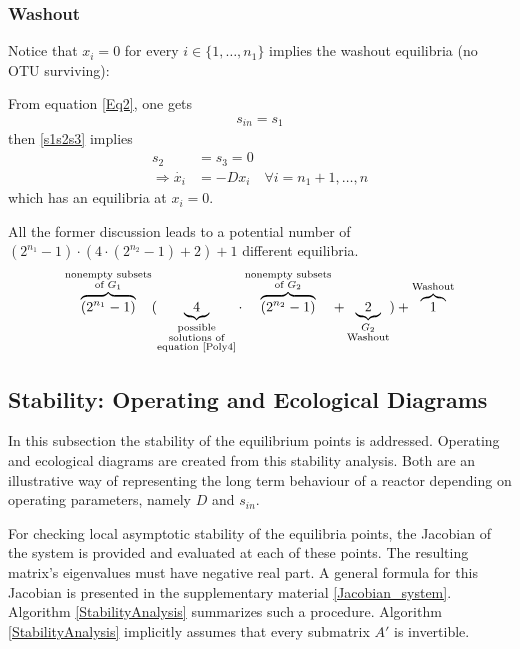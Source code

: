 \documentclass[3p,times]{elsarticle}
\begin{document}
\subsubsection{Washout}	
Notice that $x_i = 0$ for every $i \in \{1,\dots, n_1\}$ implies the washout equilibria (no OTU surviving):

From equation \eqref{Eq2}, one gets 
\begin{align*} s_{in} = s_1 \end{align*}
then \eqref{s1s2s3} implies \begin{align*}s_2 &= s_3 = 0 \\ \Rightarrow \dot{x_i} &= -Dx_i \quad \forall i = n_1+1, \dots, n\end{align*}   
which has an equilibria at $x_i = 0$. 

All the former discussion leads to a potential number of   $ (2^{n_1}-1)\cdot (4\cdot(2^{n_2}-1)+2)+1 $  different equilibria. 
\begin{align} \overbrace{(2^{n_1}-1)}^{\substack{\text{nonempty subsets} \\ \text{of }G_1 }} (\underbrace{4}_{\substack{\text{possible} \\ \text{solutions of} \\ \text{equation \eqref{Poly4}}}} \cdot\overbrace{(2^{n_2}-1)}^{\substack{\text{nonempty subsets} \\ \text{of  }G_2}}+\underbrace{2}_{\substack{G_2 \\ \text{Washout}}})+\overbrace{1}^\text{Washout} 
\end{align}

\subsection{Stability: Operating and Ecological Diagrams}

In this subsection the stability of the equilibrium points is addressed. Operating and ecological diagrams are created from this stability analysis. Both are an illustrative way of representing the long term behaviour of a reactor depending on operating parameters, namely $D$ and $s_{in}$. 

For checking local asymptotic stability of the equilibria points, the Jacobian of the system is provided and evaluated at each of these points. The resulting matrix's eigenvalues must have negative real part. A general formula for this Jacobian is presented in the supplementary material \eqref{Jacobian_system}. Algorithm \ref{StabilityAnalysis} summarizes such a procedure. Algorithm \ref{StabilityAnalysis} implicitly assumes that every submatrix $A'$ is invertible.
\end{document}

